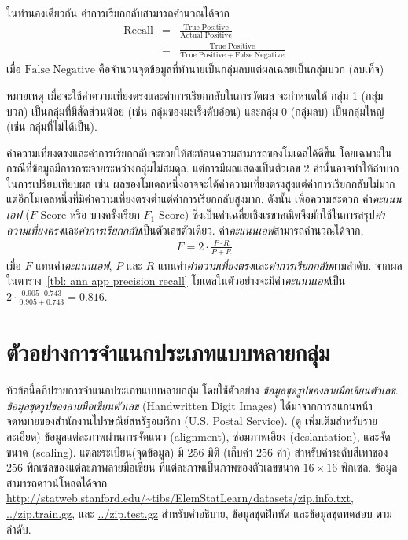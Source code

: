 ในทำนองเดียวกัน ค่าการเรียกกลับสามารถคำนวณได้จาก
\begin{eqnarray}
   \mathrm{Recall} &=& \frac{\mathrm{True\; Positive}}{\mathrm{Actual\; Positive}}
\label{eq: ann app recall 1} \\
   &=& \frac{\mathrm{True\; Positive}}{\mathrm{True\; Positive} + \mathrm{False\; Negative}}
\label{eq: ann app recall 2}
\end{eqnarray}
เมื่อ $\mathrm{False\; Negative}$ คือจำนวนจุดข้อมูลที่ทำนายเป็นกลุ่มลบแต่ผลเฉลยเป็นกลุ่มบวก (ลบเท็จ)

หมายเหตุ เมื่อจะใช้ค่าความเที่ยงตรงและค่าการเรียกกลับในการวัดผล จะกำหนดให้ กลุ่ม 1 (กลุ่มบวก) เป็นกลุ่มที่มีสัดส่วนน้อย (เช่น กลุ่มของมะเร็งตับอ่อน) และกลุ่ม 0 (กลุ่มลบ) เป็นกลุ่มใหญ่ (เช่น กลุ่มที่ไม่ได้เป็น).

ค่าความเที่ยงตรงและค่าการเรียกกลับจะช่วยให้สะท้อนความสามารถของโมเดลได้ดีขึ้น โดยเฉพาะในกรณีที่ข้อมูลมีการกระจายระหว่างกลุ่มไม่สมดุล.
%
แต่การมีผลแสดงเป็นตัวเลข $2$ ค่านั้นอาจทำให้ลำบากในการเปรียบเทียบผล 
เช่น ผลของโมเดลหนึ่งอาจจะได้ค่าความเที่ยงตรงสูงแต่ค่าการเรียกกลับไม่มาก 
แต่อีกโมเดลหนึ่งที่มีค่าความเที่ยงตรงต่ำแต่ค่าการเรียกกลับสูงมาก.
ดังนั้น เพื่อความสะดวก ค่า\textit{คะแนนเอฟ} ($F$ Score หรือ บางครั้งเรียก $F_1$ Score) ซึ่งเป็นค่าเฉลี่ยเชิงเรขาคณิตจึงมักใช้ในการสรุป\textit{ค่าความเที่ยงตรง}และ\textit{ค่าการเรียกกลับ}เป็นตัวเลขตัวเดียว.
ค่า\textit{คะแนนเอฟ}สามารถคำนวณได้จาก,
\begin{eqnarray}
   F = 2 \cdot \frac{P \cdot R}{P + R}
\end{eqnarray}
เมื่อ $F$ แทนค่า\textit{คะแนนเอฟ}, $P$ และ $R$ แทนค่า\textit{ค่าความเที่ยงตรง}และ\textit{ค่าการเรียกกลับ}ตามลำดับ.
จากผลในตาราง~\ref{tbl: ann app precision recall} โมเดลในตัวอย่างจะมีค่า\textit{คะแนนเอฟ}เป็น $2 \cdot \frac{0.905 \cdot 0.743}{0.905 + 0.743} = 0.816$.

\section{ตัวอย่างการจำแนกประเภทแบบหลายกลุ่ม}
\label{section: multiclass example}

ห้วข้อนี้อภิปรายการจำแนกประเภทแบบหลายกลุ่ม โดยใช้ตัวอย่าง \textit{ข้อมูลชุดรูปของลายมือเขียนตัวเลข}.
\textit{ข้อมูลชุดรูปของลายมือเขียนตัวเลข} (Handwritten Digit Images) ได้มาจากการสแกนหน้าจดหมายของสำนักงานไปรษณีย์สหรัฐอเมริกา (U.S. Postal Service).
(ดู \cite{LeCunEtAl1990a} เพิ่มเติมสำหรับรายละเอียด)
ข้อมูลแต่ละภาพผ่านการจัดแนว (alignment), ซ่อมภาพเอียง (deslantation), และจัดขนาด (scaling). 
แต่ละระเบียน(จุดข้อมูล) มี $256$ มิติ (เก็บค่า $256$ ค่า) สำหรับค่าระดับสีเทาของ $256$ พิกเซลของแต่ละภาพลายมือเขียน ที่แต่ละภาพเป็นภาพของตัวเลขขนาด $16 \times 16$ พิกเซล.
ข้อมูลสามารถดาวน์โหลดได้จาก \url{http://statweb.stanford.edu/~tibs/ElemStatLearn/datasets/zip.info.txt}, \url{../zip.train.gz}, และ \url{../zip.test.gz} สำหรับคำอธิบาย, ข้อมูลชุดฝึกหัด และข้อมูลชุดทดสอบ ตามลำดับ.

